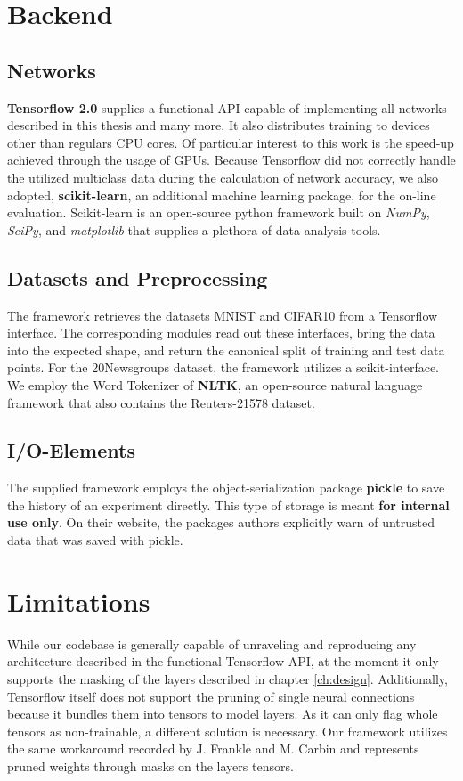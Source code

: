 
\section{Backend}

\subsection{Networks}
\textbf{Tensorflow 2.0} supplies a functional API capable of implementing all networks described in this thesis and many more. It also distributes training to devices other than regulars CPU cores.\cite{Tensorflow} Of particular interest to this work is the speed-up achieved through the usage of GPUs.
Because Tensorflow did not correctly handle the utilized multiclass data during the calculation of network accuracy, we also adopted, \textbf{scikit-learn}, an additional machine learning package, for the on-line evaluation. 
Scikit-learn is an open-source python framework built on \textit{NumPy}, \textit{SciPy}, and \textit{matplotlib} that supplies a plethora of data analysis tools.\cite{scikit-learn}

\subsection{Datasets and Preprocessing}
The framework retrieves the datasets MNIST and CIFAR10 from a Tensorflow interface. The corresponding modules read out these interfaces, bring the data into the expected shape, and return the canonical split of training and test data points. 
For the 20Newsgroups dataset, the framework utilizes a scikit-interface.\\
We employ the Word Tokenizer of \textbf{NLTK}, an open-source natural language framework that also contains the Reuters-21578 dataset.\cite{NLTK}

\subsection{I/O-Elements}
The supplied framework employs the object-serialization package \textbf{pickle} to save the history of an experiment directly. This type of storage is meant \textbf{for internal use only}. On their website, the packages authors explicitly warn of untrusted data that was saved with pickle.

\section{Limitations}
While our codebase is generally capable of unraveling and reproducing any architecture described in the functional Tensorflow API, at the moment it only supports the masking of the layers described in chapter \ref{ch:design}. Additionally, Tensorflow itself does not support the pruning of single neural connections because it bundles them into tensors to model layers. As it can only flag whole tensors as non-trainable, a different solution is necessary. Our framework utilizes the same workaround recorded by J. Frankle and M. Carbin and represents pruned weights through masks on the layers tensors.
